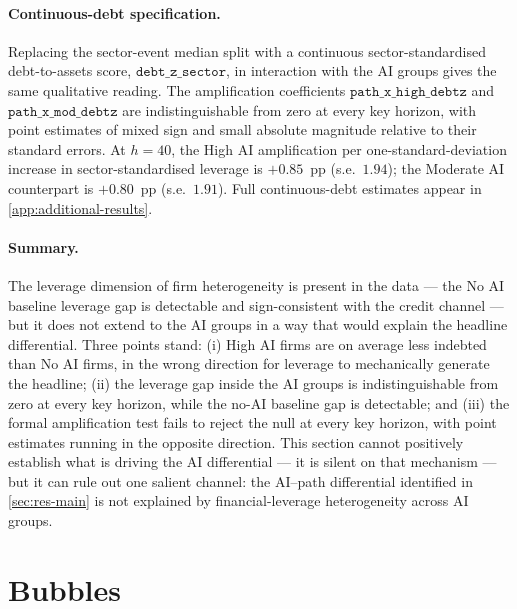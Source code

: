 \paragraph{Continuous-debt specification.} Replacing the sector-event
median split with a continuous sector-standardised debt-to-assets
score, $\texttt{debt\_z\_sector}$, in interaction with the AI groups
gives the same qualitative reading. The amplification coefficients
$\texttt{path\_x\_high\_debtz}$ and $\texttt{path\_x\_mod\_debtz}$
are indistinguishable from zero at every key horizon, with point
estimates of mixed sign and small absolute magnitude relative to
their standard errors. At $h = 40$, the High AI amplification per
one-standard-deviation increase in sector-standardised leverage is
$+0.85$~pp (s.e.~$1.94$); the Moderate AI counterpart is $+0.80$~pp
(s.e.~$1.91$). Full continuous-debt estimates appear in
\cref{app:additional-results}.
 
\paragraph{Summary.} The leverage dimension of firm heterogeneity is
present in the data --- the No AI baseline leverage gap is
detectable and sign-consistent with the credit channel --- but it
does not extend to the AI groups in a way that would explain the
headline differential. Three points stand: (i) High AI firms are on
average less indebted than No AI firms, in the wrong direction for
leverage to mechanically generate the headline; (ii) the leverage
gap inside the AI groups is indistinguishable from zero at every key
horizon, while the no-AI baseline gap is detectable; and (iii) the
formal amplification test fails to reject the null at every key
horizon, with point estimates running in the opposite direction.
This section cannot positively establish what is driving the AI
differential --- it is silent on that mechanism --- but it can rule
out one salient channel: the AI--path differential identified in
\cref{sec:res-main} is not explained by financial-leverage
heterogeneity across AI groups.


\section{Bubbles}
 
